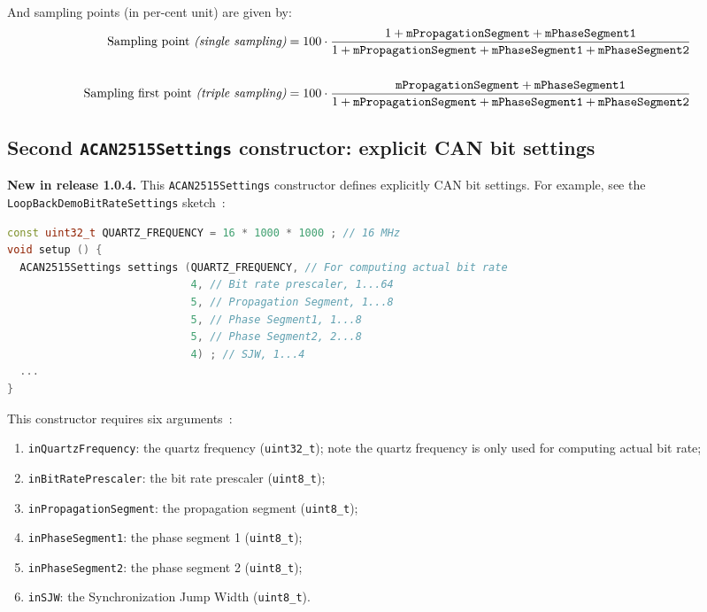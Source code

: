 \documentclass[10pt, a4paper, obeyspaces]{extarticle}
\newcommand \subsectionLabel[2]{\subsection{#1}\label{subsec:#2}}
\begin{document}
And sampling points (in per-cent unit) are given by:
{\small
\begin{align*}
\text{Sampling point {\it(single sampling)}} & = 100 \cdot \frac{1 + \texttt{mPropagationSegment} + \texttt{mPhaseSegment1}}{1 + \texttt{mPropagationSegment} + \texttt{mPhaseSegment1} + \texttt{mPhaseSegment2}}  \\
  & \\
\text{Sampling first point {\it(triple sampling)}} & = 100 \cdot \frac{\texttt{mPropagationSegment} + \texttt{mPhaseSegment1}}{1 + \texttt{mPropagationSegment} + \texttt{mPhaseSegment1} + \texttt{mPhaseSegment2}}
\end{align*}
}




\subsectionLabel{Second \texttt{ACAN2515Settings} constructor: explicit CAN bit settings}{explicitCANbitSettings}

{\bf New in release 1.0.4.} This \texttt{ACAN2515Settings} constructor defines explicitly CAN bit settings. For example, see the \texttt{LoopBackDemoBitRateSettings} sketch~:
{ \small\begin{lstlisting}[language=c++]
const uint32_t QUARTZ_FREQUENCY = 16 * 1000 * 1000 ; // 16 MHz
void setup () {
  ACAN2515Settings settings (QUARTZ_FREQUENCY, // For computing actual bit rate
                             4, // Bit rate prescaler, 1...64
                             5, // Propagation Segment, 1...8
                             5, // Phase Segment1, 1...8
                             5, // Phase Segment2, 2...8
                             4) ; // SJW, 1...4
  ...
}
\end{lstlisting}}

This constructor requires six arguments~:
\begin{enumerate}
  \item \texttt{inQuartzFrequency}: the quartz frequency (\texttt{uint32\_t}); note the quartz frequency is only used for computing actual bit rate;
  \item \texttt{inBitRatePrescaler}: the bit rate prescaler (\texttt{uint8\_t});
  \item \texttt{inPropagationSegment}: the propagation segment (\texttt{uint8\_t});
  \item \texttt{inPhaseSegment1}: the phase segment 1 (\texttt{uint8\_t});
  \item \texttt{inPhaseSegment2}: the phase segment 2 (\texttt{uint8\_t});
  \item \texttt{inSJW}: the Synchronization Jump Width (\texttt{uint8\_t}).
\end{enumerate}
\end{document}
